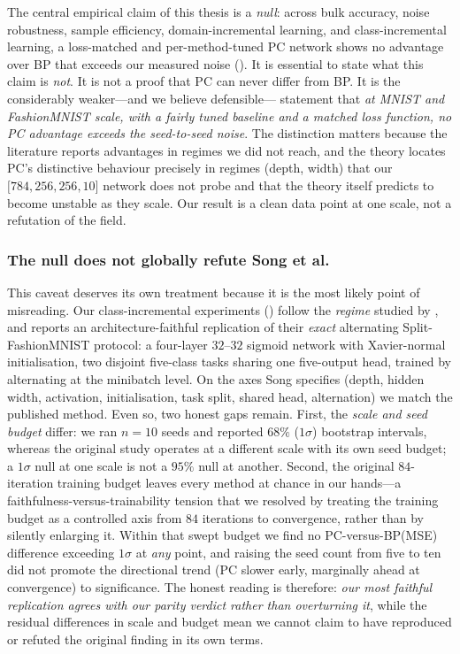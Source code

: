 The central empirical claim of this thesis is a \emph{null}: across bulk accuracy,
noise robustness, sample efficiency, domain-incremental learning, and
class-incremental learning, a loss-matched and per-method-tuned PC network shows no
advantage over BP that exceeds our measured noise (). It is
essential to state what this claim is \emph{not}. It is not a proof that PC can
never differ from BP. It is the considerably weaker---and we believe defensible---
statement that \emph{at MNIST and FashionMNIST scale, with a fairly tuned baseline
and a matched loss function, no PC advantage exceeds the seed-to-seed noise}. The
distinction matters because the literature reports advantages in regimes we did not
reach, and the theory \citep{innocenti2026limits} locates PC's distinctive behaviour
precisely in regimes (depth, width) that our $\lbrack 784, 256, 256, 10\rbrack$
network does not probe and that the theory itself predicts to become unstable as
they scale. Our result is a clean data point at one scale, not a refutation of the
field.

\subsubsection{The null does not globally refute Song et al.}

This caveat deserves its own treatment because it is the most likely point of
misreading. Our class-incremental experiments () follow the
\emph{regime} studied by \citet{song2024prospective}, and 
reports an architecture-faithful replication of their \emph{exact} alternating
Split-FashionMNIST protocol: a four-layer $32$--$32$ sigmoid network with
Xavier-normal initialisation, two disjoint five-class tasks sharing one five-output
head, trained by alternating at the minibatch level. On the axes Song specifies
(depth, hidden width, activation, initialisation, task split, shared head,
alternation) we match the published method. Even so, two honest gaps remain. First,
the \emph{scale and seed budget} differ: we ran $n=10$ seeds and reported $68\%$
($1\sigma$) bootstrap intervals, whereas the original study operates at a different
scale with its own seed budget; a $1\sigma$ null at one scale is not a $95\%$ null
at another. Second, the original $84$-iteration training budget leaves every method
at chance in our hands---a faithfulness-versus-trainability tension that we resolved
by treating the training budget as a controlled axis from $84$ iterations to
convergence, rather than by silently enlarging it. Within that swept budget we find
no PC-versus-BP(MSE) difference exceeding $1\sigma$ at \emph{any} point, and raising
the seed count from five to ten did not promote the directional trend (PC slower
early, marginally ahead at convergence) to significance. The honest reading is
therefore: \emph{our most faithful replication agrees with our parity verdict rather
than overturning it}, while the residual differences in scale and budget mean we
cannot claim to have reproduced or refuted the original finding in its own terms.

